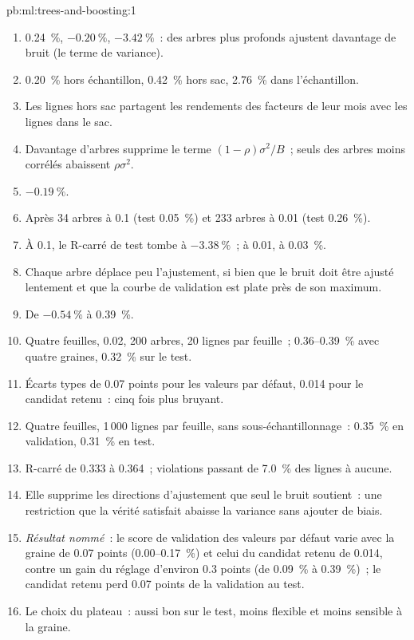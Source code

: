 \begin{solution}{pb:ml:trees-and-boosting:1}
\begin{enumerate}
\item 0.24~\%, $-0.20~\%$, $-3.42~\%$~: des arbres plus profonds ajustent davantage de bruit (le terme de variance).
\item 0.20~\% hors échantillon, 0.42~\% hors sac, 2.76~\% dans l'échantillon.
\item Les lignes hors sac partagent les rendements des facteurs de leur mois avec les lignes dans le sac.
\item Davantage d'arbres supprime le terme $(1-\rho)\sigma^2/B$~; seuls des arbres moins corrélés abaissent $\rho\sigma^2$.
\item $-0.19~\%$.
\item Après 34 arbres à 0.1 (test 0.05~\%) et 233 arbres à 0.01 (test 0.26~\%).
\item À 0.1, le R-carré de test tombe à $-3.38~\%$~; à 0.01, à 0.03~\%.
\item Chaque arbre déplace peu l'ajustement, si bien que le bruit doit être ajusté lentement et que la courbe de validation est plate près de son maximum.
\item De $-0.54~\%$ à 0.39~\%.
\item Quatre feuilles,  0.02, 200 arbres, 20 lignes par feuille~; 0.36--0.39~\% avec quatre graines, 0.32~\% sur le test.
\item Écarts types de 0.07 points pour les valeurs par défaut, 0.014 pour le candidat retenu~: cinq fois plus bruyant.
\item Quatre feuilles, 1\,000 lignes par feuille, sans sous-échantillonnage~: 0.35~\% en validation, 0.31~\% en test.
\item R-carré de 0.333 à 0.364~; violations passant de 7.0~\% des lignes à aucune.
\item Elle supprime les directions d'ajustement que seul le bruit soutient~: une restriction que la vérité satisfait abaisse la variance
sans ajouter de biais.
\item \emph{Résultat nommé}~: le score de validation des valeurs par défaut varie avec la graine de 0.07 points (0.00--0.17~\%) et celui du
candidat retenu de 0.014, contre un gain du réglage d'environ 0.3 points (de 0.09~\% à 0.39~\%)~; le candidat retenu perd 0.07 points
de la validation au test.
\item Le choix du plateau~: aussi bon sur le test, moins flexible et moins sensible à la graine.

\end{enumerate}
\end{solution}

